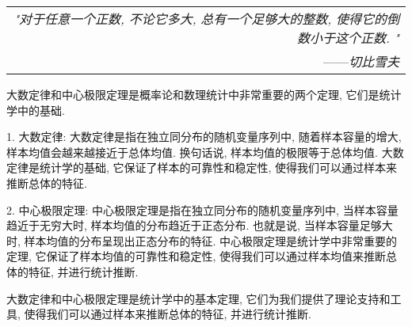 \begin{flushright}
    \begin{tabular}{r|||}
        \textit{"对于任意一个正数, 不论它多大, 总有一个足够大的整数, 使得它的倒数小于这个正数. "}\\
        ——\textit{切比雪夫}
    \end{tabular}
\end{flushright}


大数定律和中心极限定理是概率论和数理统计中非常重要的两个定理, 它们是统计学中的基础. 

1. 大数定律: 大数定律是指在独立同分布的随机变量序列中, 随着样本容量的增大, 样本均值会越来越接近于总体均值. 换句话说, 样本均值的极限等于总体均值. 大数定律是统计学的基础, 它保证了样本的可靠性和稳定性, 使得我们可以通过样本来推断总体的特征. 

2. 中心极限定理: 中心极限定理是指在独立同分布的随机变量序列中, 当样本容量趋近于无穷大时, 样本均值的分布趋近于正态分布. 也就是说, 当样本容量足够大时, 样本均值的分布呈现出正态分布的特征. 中心极限定理是统计学中非常重要的定理, 它保证了样本均值的可靠性和稳定性, 使得我们可以通过样本均值来推断总体的特征, 并进行统计推断. 

大数定律和中心极限定理是统计学中的基本定理, 它们为我们提供了理论支持和工具, 使得我们可以通过样本来推断总体的特征, 并进行统计推断. 